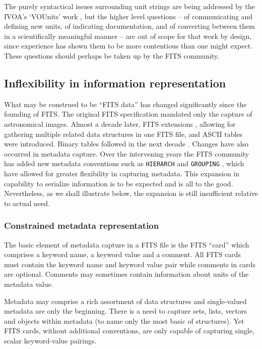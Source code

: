 \documentclass[final,authoryear,5p,times,twocolumn]{elsarticle}
\begin{document}
{{The purely syntactical issues surrounding unit strings are
being addressed by the IVOA's `VOUnits' work \citep{VOUnits}, but the higher
level questions -- of communicating and defining new units, of
indicating documentation, and of converting between them in a
scientifically meaningful manner -- are out of scope for that work by
design, since experience has shown them to be more contentious than
one might expect.  These questions should perhaps be taken up by the FITS community.


\subsection{Inflexibility in information representation}
\label{section_inflex_represent}


What may be construed to be ``FITS data'' has changed significantly
since the founding of FITS. The original FITS specification mandated
only the capture of astronomical images. Almost a decade later, FITS
extensions \citep{1988A&AS...73..359G}, allowing for gathering
multiple related data structures in one FITS file, and ASCII tables
\citep{1988A&AS...73..365H} were introduced. Binary tables followed in
the next decade \citep{1995A&AS..113..159C}. Changes have also
occurred in metadata capture. Over the intervening years the FITS
community has added new metadata conventions such as \texttt{HIERARCH}
\citep{2009Wic} and \texttt{GROUPING} \citep{2007Jen,1995ASPC...77..229J}, which have
allowed for greater flexibility in capturing metadata.
This expansion in capability to serialize information is to be
expected and is all to the good. Nevertheless, as we shall illustrate
below, the expansion is still insufficient relative to actual need.


\subsubsection{Constrained metadata representation}
\label{subsection_information_representation}


The basic element of metadata capture in a FITS file is the FITS
``card'' which comprises a keyword name, a keyword value and a
comment. All FITS cards must contain the keyword name and keyword
value pair while comments in cards are optional. Comments may
sometimes contain information about units of the metadata value.

Metadata may comprise a rich assortment of data structures and
single-valued metadata are only the beginning. There is a need to
capture sets, lists, vectors and objects within metadata (to name only
the most basic of structures). Yet FITS cards, without additional
conventions, are only capable of capturing single, scalar keyword-value
pairings.

}}
\end{document}
